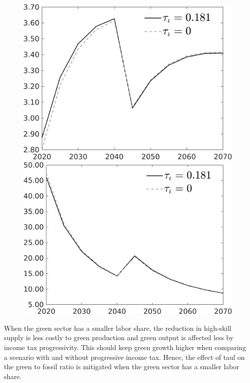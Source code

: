\documentclass[12pt]{article}
\begin{document}
\begin{figure}[h!!]
\begin{minipage}[]{0.32\textwidth}
	\end{minipage}	
	\begin{minipage}[]{0.32\textwidth}
		\includegraphics[width=1\textwidth]{../../codding_model/own_basedOnFried/optimalPol_010922_revision/figures/all_13Sept22/CompTauf_bytaul_Equlab_Reg0_gAn_spillover0_nsk0_xgr0_knspil0_sep0_LFlimit1_emsbase0_countec0_GovRev0_etaa0.79_lgd1.png}
	\end{minipage}	
	\begin{minipage}[]{0.32\textwidth}
		\includegraphics[width=1\textwidth]{../../codding_model/own_basedOnFried/optimalPol_010922_revision/figures/all_13Sept22/CompTauf_bytaul_Equlab_Reg0_gAg_spillover0_nsk0_xgr0_knspil0_sep0_LFlimit1_emsbase0_countec0_GovRev0_etaa0.79_lgd1.png}
	\end{minipage}	
\end{figure}
When the green sector has a smaller labor share, the reduction in high-skill supply is less costly to green production and green output is affected less by income tax progressivity. This should keep green growth higher when comparing a scenario with and without progressive income tax. Hence, the effect of taul on the green to fossil ratio is mitigated when the green sector has a smaller labor share. 
\end{document}
